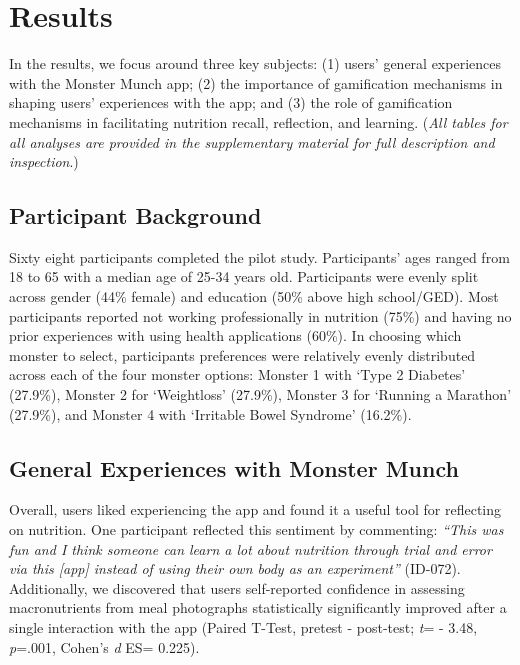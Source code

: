\vspace{-5pt}
\section{Results}

In the results, we focus around three key subjects: (1) users' general experiences with the Monster Munch app; (2) the importance of gamification mechanisms in shaping users' experiences with the app; and (3) the role of gamification mechanisms in facilitating nutrition recall, reflection, and learning. (\textit{All tables for all analyses are provided in the supplementary material for full description and inspection}.)

\vspace{-5pt}
\subsection{Participant Background}
Sixty eight participants completed the pilot study. Participants' ages ranged from 18 to 65 with a median age of 25-34 years old. Participants were evenly split across gender (44\% female) and education (50\% above high school/GED). Most participants reported not working professionally in nutrition (75\%) and having no prior experiences with using health applications (60\%). In choosing which monster to select, participants preferences were relatively evenly distributed across each of the four monster options: Monster 1 with `Type 2 Diabetes' (27.9\%), Monster 2 for `Weightloss' (27.9\%), Monster 3 for `Running a Marathon' (27.9\%), and Monster 4 with `Irritable Bowel Syndrome' (16.2\%). 


\vspace{-5pt}
\subsection{General Experiences with Monster Munch}

Overall, users liked experiencing the app and found it a useful tool for reflecting on nutrition. One participant reflected this sentiment by commenting: \textit{``This was fun and I think someone can learn a lot about nutrition through trial and error via this [app] instead of using their own body as an experiment''} (ID-072). Additionally, we discovered that users self-reported confidence in assessing macronutrients from meal photographs statistically significantly improved after a single interaction with the app (Paired T-Test, pretest - post-test; \textit{t}= - 3.48, \textit{p}=.001, Cohen's \textit{d} ES= 0.225).


